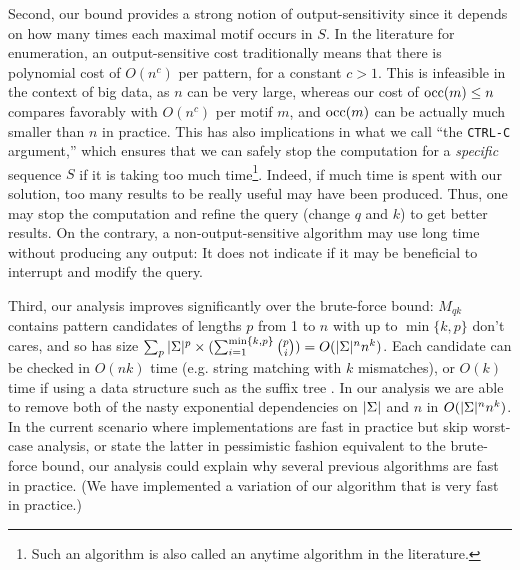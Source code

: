 Second, our bound provides a strong notion of output-sensitivity since it depends on how many times each maximal motif occurs in $S$. In the literature for enumeration, an output-sensitive cost traditionally means that there is polynomial cost of $O(n^c)$ per pattern, for a constant $c>1$. This is infeasible in the context of big data, as $n$ can be very large, whereas our cost of $\operatorname{occ}(m) \leq n$ compares favorably with $O(n^c)$ per motif $m$, and $\operatorname{occ}(m)$ can be actually much smaller than $n$ in practice. This has also implications in what we call ``the \texttt{CTRL-C} argument,'' which ensures that we can safely stop the computation for a \emph{specific} sequence $S$ if it is taking too much time\footnote{Such an algorithm is also called an anytime algorithm in the literature.}.
Indeed, if much time is spent with our solution, too many results to be really useful may have been produced. Thus, one may stop the computation and refine the query (change $q$ and $k$) to get better results. On the contrary, a non-output-sensitive algorithm may use long time without producing any output: It does not indicate if it may be beneficial to interrupt and modify the query. 

Third, our analysis improves significantly over the brute-force bound: $M_{qk}$ contains pattern candidates of lengths $p$ from 1 to $n$ with up to $\min\{k,p\}$ don't cares, and so has size $\sum_p |\Sigma|^p \times (\sum_{i=1}^{\min\{k,p\}} {p \choose i}) = O(|\Sigma|^n n^k)$. Each candidate can be checked in $O(nk)$ time (e.g. string matching with $k$ mismatches), or $O(k)$ time if using a data structure such as the suffix tree \cite{sagot1998spelling}. In our analysis we are able to remove both of the nasty exponential dependencies on $|\Sigma|$ and $n$ in $O(|\Sigma|^n n^k)$. In the current scenario where implementations are fast in practice but skip worst-case analysis, or state the latter in pessimistic fashion equivalent to the brute-force bound, our analysis could explain why several previous algorithms are fast in practice. (We have implemented a variation of our algorithm that is very fast in practice.) 



